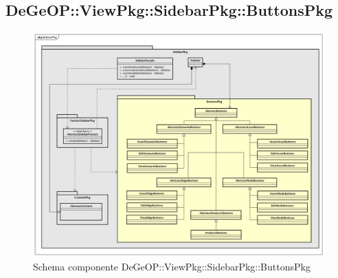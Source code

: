 \subsection{DeGeOP::ViewPkg::SidebarPkg::ButtonsPkg}
\label{pkg::ButtonsPkg}
\begin{figure}[H]
	\centering
	\includegraphics[width=\textwidth]{img/PkgDiagram/STButtonsPkg.png}
	\caption{Schema componente DeGeOP::ViewPkg::SidebarPkg::ButtonsPkg}
\end{figure}
